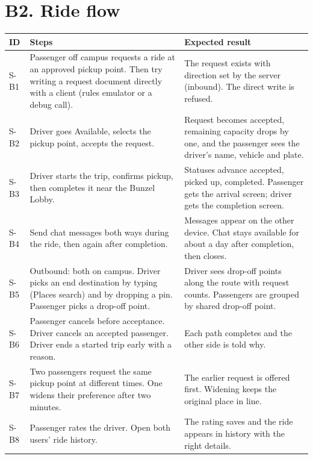 \section*{B2. Ride flow}
\small
\begin{longtable}{|p{1.1cm}|p{6.6cm}|p{6.3cm}|}
\hline
\textbf{ID} & \textbf{Steps} & \textbf{Expected result} \\
\hline
\endhead
S-B1 & Passenger off campus requests a ride at an approved pickup point. Then try writing a request document directly with a client (rules emulator or a debug call). & The request exists with direction set by the server (inbound). The direct write is refused. \\
\hline
S-B2 & Driver goes Available, selects the pickup point, accepts the request. & Request becomes accepted, remaining capacity drops by one, and the passenger sees the driver’s name, vehicle and plate. \\
\hline
S-B3 & Driver starts the trip, confirms pickup, then completes it near the Bunzel Lobby. & Statuses advance accepted, picked up, completed. Passenger gets the arrival screen; driver gets the completion screen. \\
\hline
S-B4 & Send chat messages both ways during the ride, then again after completion. & Messages appear on the other device. Chat stays available for about a day after completion, then closes. \\
\hline
S-B5 & Outbound: both on campus. Driver picks an end destination by typing (Places search) and by dropping a pin. Passenger picks a drop-off point. & Driver sees drop-off points along the route with request counts. Passengers are grouped by shared drop-off point. \\
\hline
S-B6 & Passenger cancels before acceptance. Driver cancels an accepted passenger. Driver ends a started trip early with a reason. & Each path completes and the other side is told why. \\
\hline
S-B7 & Two passengers request the same pickup point at different times. One widens their preference after two minutes. & The earlier request is offered first. Widening keeps the original place in line. \\
\hline
S-B8 & Passenger rates the driver. Open both users’ ride history. & The rating saves and the ride appears in history with the right details. \\
\hline
\end{longtable}
\normalsize


